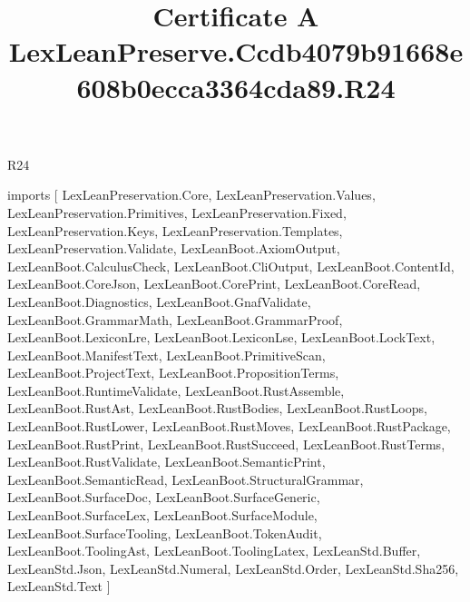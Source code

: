 \begin{lexlean}{R24}
\title{Certificate A LexLeanPreserve.Ccdb4079b91668e608b0ecca3364cda89.R24}
\begin{coremodule}
imports [
  LexLeanPreservation.Core,
  LexLeanPreservation.Values,
  LexLeanPreservation.Primitives,
  LexLeanPreservation.Fixed,
  LexLeanPreservation.Keys,
  LexLeanPreservation.Templates,
  LexLeanPreservation.Validate,
  LexLeanBoot.AxiomOutput,
  LexLeanBoot.CalculusCheck,
  LexLeanBoot.CliOutput,
  LexLeanBoot.ContentId,
  LexLeanBoot.CoreJson,
  LexLeanBoot.CorePrint,
  LexLeanBoot.CoreRead,
  LexLeanBoot.Diagnostics,
  LexLeanBoot.GnafValidate,
  LexLeanBoot.GrammarMath,
  LexLeanBoot.GrammarProof,
  LexLeanBoot.LexiconLre,
  LexLeanBoot.LexiconLse,
  LexLeanBoot.LockText,
  LexLeanBoot.ManifestText,
  LexLeanBoot.PrimitiveScan,
  LexLeanBoot.ProjectText,
  LexLeanBoot.PropositionTerms,
  LexLeanBoot.RuntimeValidate,
  LexLeanBoot.RustAssemble,
  LexLeanBoot.RustAst,
  LexLeanBoot.RustBodies,
  LexLeanBoot.RustLoops,
  LexLeanBoot.RustLower,
  LexLeanBoot.RustMoves,
  LexLeanBoot.RustPackage,
  LexLeanBoot.RustPrint,
  LexLeanBoot.RustSucceed,
  LexLeanBoot.RustTerms,
  LexLeanBoot.RustValidate,
  LexLeanBoot.SemanticPrint,
  LexLeanBoot.SemanticRead,
  LexLeanBoot.StructuralGrammar,
  LexLeanBoot.SurfaceDoc,
  LexLeanBoot.SurfaceGeneric,
  LexLeanBoot.SurfaceLex,
  LexLeanBoot.SurfaceModule,
  LexLeanBoot.SurfaceTooling,
  LexLeanBoot.TokenAudit,
  LexLeanBoot.ToolingAst,
  LexLeanBoot.ToolingLatex,
  LexLeanStd.Buffer,
  LexLeanStd.Json,
  LexLeanStd.Numeral,
  LexLeanStd.Order,
  LexLeanStd.Sha256,
  LexLeanStd.Text
]


\end{coremodule}
\end{lexlean}
